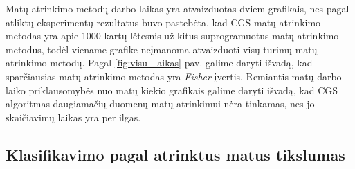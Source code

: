 Matų atrinkimo metodų darbo laikas yra atvaizduotas dviem grafikais, nes pagal atliktų eksperimentų rezultatus buvo pastebėta, kad CGS matų atrinkimo metodas yra apie 1000 kartų lėtesnis už kitus suprogramuotus matų atrinkimo metodus, todėl viename grafike neįmanoma atvaizduoti visų turimų matų atrinkimo metodų. Pagal \ref{fig:visu_laikas} pav. galime daryti išvadą, kad sparčiausias matų atrinkimo metodas yra \textit{Fisher} įvertis. Remiantis matų darbo laiko priklausomybės nuo matų kiekio grafikais galime daryti išvadą, kad CGS algoritmas daugiamačių duomenų matų atrinkimui nėra tinkamas, nes jo skaičiavimų laikas yra per ilgas.

\subsection{Klasifikavimo pagal atrinktus matus tikslumas}

